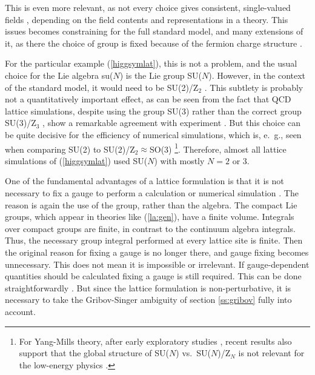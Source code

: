 \documentclass[final,twoside,12pt]{article}
\newcommand*{\pref}[1]{(\ref{#1})}
\newcommand*{\1}{1\!\!\!\bot}
\begin{document}
This is even more relevant, as not every choice gives consistent, single-valued fields \cite{O'Raifeartaigh:1986vq}, depending on the field contents and representations in a theory. This issues becomes constraining for the full standard model, and many extensions of it, as there the choice of group is fixed because of the fermion charge structure \cite{O'Raifeartaigh:1986vq}.

For the particular example \pref{higgsymlat}, this is not a problem, and the usual choice for the Lie algebra su($N$) is the Lie group SU($N$). However, in the context of the standard model, it would need to be SU(2)/Z$_2$ \cite{O'Raifeartaigh:1986vq}. This subtlety is probably not a quantitatively important effect, as can be seen from the fact that QCD lattice simulations, despite using the group SU(3) rather than the correct group SU(3)/Z$_3$ \cite{O'Raifeartaigh:1986vq}, show a remarkable agreement with experiment \cite{Gattringer:2010zz,DeGrand:2006zz}. But this choice can be quite decisive for the efficiency of numerical simulations, which is, e.\ g., seen when comparing SU(2) to SU(2)/Z$_2\approx$SO(3) \cite{deForcrand:2002vs,Friedberg:1995cq,Burgio:2006xj,Burgio:2006dc}\footnote{For Yang-Mills theory, after early exploratory studies \cite{Greensite:1981hw,Halliday:1981te,Creutz:1982ga,Drouffe:1982fe}, recent results also support that the global structure of SU($N$) vs.\ SU($N$)/Z$_N$ is not relevant for the low-energy physics \cite{deForcrand:2002vx,Teper:2018aa}.}. Therefore, almost all lattice simulations of \pref{higgsymlat} used SU($N$) with mostly $N=2$ or $3$.

One of the fundamental advantages of a lattice formulation is that it is not necessary to fix a gauge to perform a calculation or numerical simulation \cite{Montvay:1994cy,Gattringer:2010zz,DeGrand:2006zz}. The reason is again the use of the group, rather than the algebra. The compact Lie groups, which appear in theories like \pref{la:gen}, have a finite volume. Integrals over compact groups are finite, in contrast to the continuum algebra integrals. Thus, the necessary group integral performed at every lattice site is finite. Then the original reason for fixing a gauge is no longer there, and gauge fixing becomes unnecessary. This does not mean it is impossible or irrelevant. If gauge-dependent quantities should be calculated fixing a gauge is still required. This can be done straightforwardly \cite{Maas:2011se}. But since the lattice formulation is non-perturbative, it is necessary to take the Gribov-Singer ambiguity of section \ref{ss:gribov} fully into account.
\end{document}
